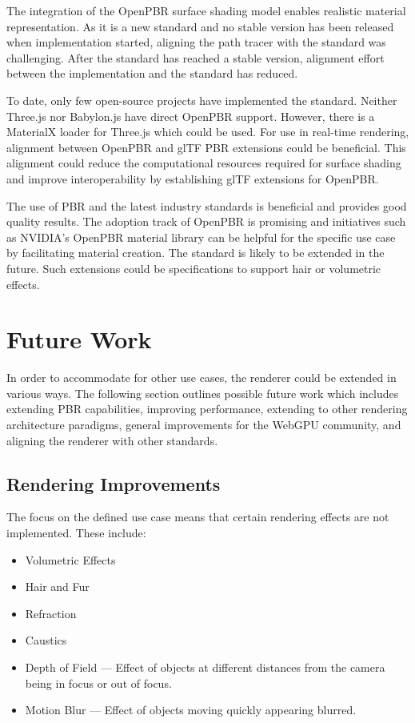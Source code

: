The integration of the \gls{OpenPBR} surface shading model enables realistic material representation. As it is a new standard and no stable version has been released when implementation started, aligning the path tracer with the standard was challenging. After the standard has reached a stable version, alignment effort between the implementation and the standard has reduced.

To date, only few open-source projects have implemented the standard. Neither \gls{Three.js} nor \gls{Babylon.js} have direct \gls{OpenPBR} support. However, there is a \gls{MaterialX} loader for \gls{Three.js} which could be used. For use in real-time rendering, alignment between \gls{OpenPBR} and \gls{glTF} \gls{PBR} extensions could be beneficial. This alignment could reduce the computational resources required for surface shading and improve interoperability by establishing \gls{glTF} extensions for \gls{OpenPBR}.

The use of \gls{PBR} and the latest industry standards is beneficial and provides good quality results. The adoption track of \gls{OpenPBR} is promising and initiatives such as NVIDIA's \gls{OpenPBR} material library \cite{omniverseOpenPBR} can be helpful for the specific use case by facilitating material creation. The standard is likely to be extended in the future. Such extensions could be specifications to support hair or volumetric effects.

\section{Future Work}

In order to accommodate for other use cases, the renderer could be extended in various ways. The following section outlines possible future work which includes extending \gls{PBR} capabilities, improving performance, extending to other rendering architecture paradigms, general improvements for the \gls{WebGPU} community, and aligning the renderer with other standards.

\subsection*{Rendering Improvements}

The focus on the defined use case means that certain rendering effects are not implemented. These include:

\begin{itemize}
    \item{Volumetric Effects}
    \item{Hair and Fur}
    \item{Refraction}
    \item{Caustics}
    \item{Depth of Field} — Effect of objects at different distances from the camera being in focus or out of focus.
    \item{Motion Blur} — Effect of objects moving quickly appearing blurred.
\end{itemize}

